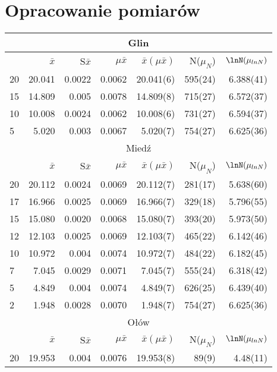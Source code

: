 \documentclass[a4paper,10pt]{article}
\begin{document}
\section{Opracowanie pomiarów}

\begin{tabular}{|l|r|r|r|r|r|r|}
\hline
\multicolumn{7}{|c|}{Glin} \\\hline
{} &$\bar{x}$&S$\bar{x}$ &$\mu\bar{x}$&$\bar{x}(\mu\bar{x})$ &N($\mu_N$) &$\lnN(\mu_{lnN})$ \\\hline
20 &  20.041 &  0.0022   &  0.0062    &  20.041(6)           &  595(24)&  6.388(41) \\\hline
15 &  14.809 &  0.005    &  0.0078    &  14.809(8)           &  715(27)&  6.572(37) \\\hline
10 &  10.008 &  0.0024   &  0.0062    &  10.008(6)           &  731(27)&  6.594(37) \\\hline
5  &   5.020 &  0.003    &  0.0067    &   5.020(7)           &  754(27)&  6.625(36) \\\hline
\multicolumn{7}{|c|}{Miedź}                                         \\\hline
{} &$\bar{x}$&S$\bar{x}$ &$\mu\bar{x}$&$\bar{x}(\mu\bar{x})$ &N($\mu_N$) &$\lnN(\mu_{lnN})$ \\\hline
20 &  20.112 &  0.0024  &  0.0069 &  20.112(7) &  281(17) &  5.638(60) \\\hline
17 &  16.966 &  0.0025  &  0.0069 &  16.966(7) &  329(18) &  5.796(55) \\\hline
15 &  15.080 &  0.0020  &  0.0068 &  15.080(7) &  393(20) &  5.973(50) \\\hline
12 &  12.103 &  0.0025  &  0.0069 &  12.103(7) &  465(22) &  6.142(46) \\\hline
10 &  10.972 &  0.004   &  0.0074 &  10.972(7) &  484(22) &  6.182(45) \\\hline
7 &   7.045  &  0.0029  &  0.0071 &   7.045(7) &  555(24) &  6.318(42) \\\hline
5 &   4.849  &  0.004   &  0.0074 &   4.849(7) &  626(25) &  6.439(40) \\\hline
2 &   1.948  &  0.0028  &  0.0070 &   1.948(7) &  754(27) &  6.625(36) \\\hline
\multicolumn{7}{|c|}{Ołów}                                          \\\hline
{} &$\bar{x}$&S$\bar{x}$ &$\mu\bar{x}$&$\bar{x}(\mu\bar{x})$ &N($\mu_N$) &$\lnN(\mu_{lnN})$ \\\hline
20 &  19.953 &  0.004  &  0.0076 &  19.953(8) &   89(9)  &  4.48(11) \\\hline

\end{tabular}
\end{document}
